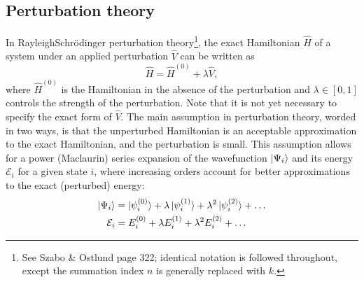 \documentclass[%
class = book,%
crop = false,%
float = true,%
multi = true,%
preview = false,%
]{standalone}
\let\cite\autocite
\begin{document}
\subsection{Perturbation theory}
\label{ssec:perturbation-theory}

In Rayleigh\textendash{}Schr{\"{o}}dinger perturbation theory\footnote{See Szabo \& Ostlund\cite{szabo1989modern} page 322; identical notation is followed throughout, except the summation index \(n\) is generally replaced with \(k\).}, the exact Hamiltonian \(\hat{H}\) of a system under an applied perturbation \(\hat{V}\) can be written as
\begin{equation}
  \label{eq:perturbed-hamiltonian}
  \hat{H} = \hat{H}^{(0)} + \lambda\hat{V},
\end{equation}
where \(\hat{H}^{(0)}\) is the Hamiltonian in the absence of the perturbation and \(\lambda \in [0,1]\) controls the strength of the perturbation. Note that it is not yet necessary to specify the exact form of \(\hat{V}\). The main assumption in perturbation theory, worded in two ways, is that the unperturbed Hamiltonian is an acceptable approximation to the exact Hamiltonian, and the perturbation is small. This assumption allows for a power (Maclaurin) series expansion of the wavefunction \(\ket{\Psi_{i}}\) and its energy \(\mathcal{E}_{i}\) for a given state \(i\), where increasing orders account for better approximations to the exact (perturbed) energy:
\begin{align}
  \label{eq:expansion-wavefunction}
  \ket{\Psi_{i}} &= \ket{\psi_{i}^{(0)}} + \lambda\ket{\psi_{i}^{(1)}} + \lambda^{2}\ket{\psi_{i}^{(2)}} + \dots \\
  \label{eq:expansion-energy}
  \mathcal{E}_{i} &= E_{i}^{(0)} + \lambda E_{i}^{(1)} + \lambda^{2} E_{i}^{(2)} + \dots
\end{align}
\end{document}
